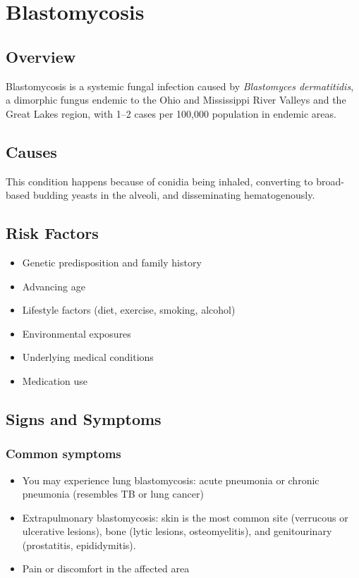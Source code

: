 \chapter{Blastomycosis}
\label{sec:Blastomycosis}

\section{Overview}
Blastomycosis is a systemic fungal infection caused by \textit{Blastomyces dermatitidis}, a dimorphic fungus endemic to the Ohio and Mississippi River Valleys and the Great Lakes region, with 1--2 cases per 100,000 population in endemic areas.
\section{Causes}
This condition happens because of conidia being inhaled, converting to broad-based budding yeasts in the alveoli, and disseminating hematogenously.     
\section{Risk Factors}

\begin{itemize}[noitemsep]
  \item Genetic predisposition and family history
  \item Advancing age
  \item Lifestyle factors (diet, exercise, smoking, alcohol)
  \item Environmental exposures
  \item Underlying medical conditions
  \item Medication use
\end{itemize}
\section{Signs and Symptoms}

\subsection{Common symptoms}
\begin{itemize}[noitemsep]
  \item You may experience lung blastomycosis: acute pneumonia or chronic pneumonia (resembles TB or lung cancer)
  \item Extrapulmonary blastomycosis: skin is the most common site (verrucous or ulcerative lesions), bone (lytic lesions, osteomyelitis), and genitourinary (prostatitis, epididymitis).
  \item Pain or discomfort in the affected area
  \end{itemize}

